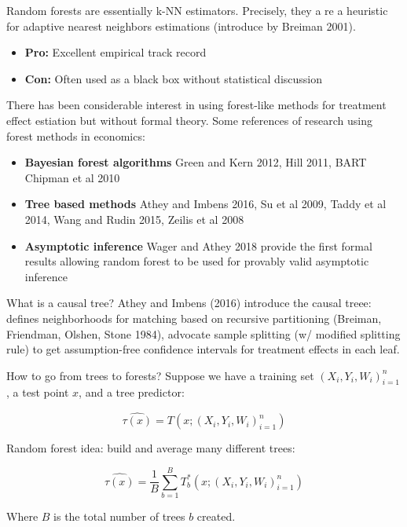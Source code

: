 \documentclass{article}
\begin{document}
Random forests are essentially k-NN estimators. Precisely, they a re a heuristic for adaptive nearest neighbors estimations (introduce by Breiman 2001).

\begin{itemize}
    \item \textbf{Pro: } Excellent empirical track record
    \item \textbf{Con: } Often used as a black box without statistical discussion
\end{itemize}

There has been considerable interest in using forest-like methods for treatment effect estiation but without formal theory. Some references of research using forest methods in economics:

\begin{itemize}
    \item \textbf{Bayesian forest algorithms} Green and Kern 2012, Hill 2011, BART Chipman et al 2010
    \item \textbf{Tree based methods } Athey and Imbens 2016, Su et al 2009, Taddy et al 2014, Wang and Rudin 2015, Zeilis et al 2008 
    \item \textbf{Asymptotic inference} Wager and Athey 2018 provide the first formal results allowing random forest to be used for provably valid asymptotic inference
\end{itemize}

What is a causal tree? Athey and Imbens (2016) introduce the causal treee: defines neighborhoods for matching based on recursive partitioning (Breiman, Friendman, Olshen, Stone 1984), advocate sample splitting (w/ modified splitting rule) to get assumption-free confidence intervals for treatment effects in each leaf.

How to go from trees to forests? Suppose we have a training set ${(X_i,Y_i,W_i)^n _{i=1}}$, a test point $x$, and a tree predictor:

\begin{equation}
    \hat{\tau(x)} = T(x ; {(X_i,Y_i,W_i)^n _{i=1}})
\end{equation}

Random forest idea: build and average many different trees:


\begin{equation}
    \hat{\tau(x)} = \frac{1}{B} \sum_{b=1}^B  T^* _b(x ; {(X_i,Y_i,W_i)^n _{i=1}})
\end{equation}

Where $B$ is the total number of trees $b$ created.
\end{document}
